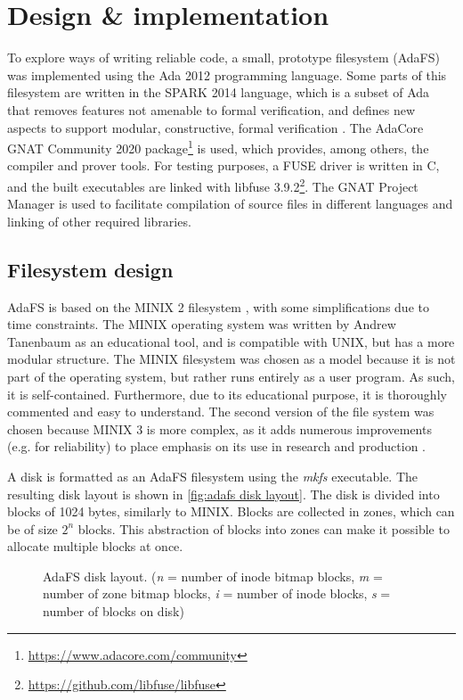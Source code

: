 \section{Design \& implementation}
To explore ways of writing reliable code, a small, prototype filesystem (AdaFS) was implemented using the Ada 2012 programming language.
Some parts of this filesystem are written in the SPARK 2014 language, which is a subset of Ada that removes features not amenable to formal verification, and defines new aspects to support modular, constructive, formal verification \cite{sparkRM}.
The AdaCore GNAT Community 2020 package\footnote{\url{https://www.adacore.com/community}} is used, which provides, among others, the compiler and prover tools.
For testing purposes, a FUSE driver is written in C, and the built executables are linked with libfuse 3.9.2\footnote{\url{https://github.com/libfuse/libfuse}}.
The GNAT Project Manager is used to facilitate compilation of source files in different languages and linking of other required libraries.

\subsection{Filesystem design}
AdaFS is based on the MINIX 2 filesystem \cite{tanenbaum1997}, with some simplifications due to time constraints.
The MINIX operating system was written by Andrew Tanenbaum as an educational tool, and is compatible with UNIX, but has a more modular structure.
The MINIX filesystem was chosen as a model because it is not part of the operating system, but rather runs entirely as a user program.
As such, it is self-contained.
Furthermore, due to its educational purpose, it is thoroughly commented and easy to understand.
The second version of the file system was chosen because MINIX 3 is more complex, as it adds numerous improvements (e.g. for reliability) to place emphasis on its use in research and production \cite{minix3history}.

A disk is formatted as an AdaFS filesystem using the \textit{mkfs} executable.
The resulting disk layout is shown in \autoref{fig:adafs disk layout}.
The disk is divided into blocks of 1024 bytes, similarly to MINIX.
Blocks are collected in zones, which can be of size $2^n$ blocks.
This abstraction of blocks into zones can make it possible to allocate multiple blocks at once.

\begin{figure}[h]
  \centering
  \caption{AdaFS disk layout. (\textit{n} = number of inode bitmap blocks, \textit{m} = number of zone bitmap blocks, \textit{i} = number of inode blocks, \textit{s} = number of blocks on disk)}
  \label{fig:adafs disk layout}
\end{figure}

